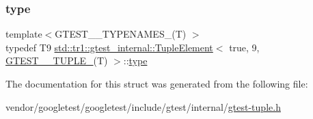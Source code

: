\subsubsection{\texorpdfstring{type}{type}}
{\footnotesize\ttfamily template$<$G\+T\+E\+S\+T\+\_\+\_\+\+T\+Y\+P\+E\+N\+A\+M\+E\+S\+\_\+(\+T) $>$ \\
typedef T9 \hyperlink{structstd_1_1tr1_1_1gtest__internal_1_1_tuple_element}{std\+::tr1\+::gtest\+\_\+internal\+::\+Tuple\+Element}$<$ true, 9, \hyperlink{namespacestd_1_1tr1_aa636d3269bf1f368a7bc09ff158bc482}{G\+T\+E\+S\+T\+\_\+\_\+\+T\+U\+P\+L\+E\+\_\+}(T) $>$\+::\hyperlink{structstd_1_1tr1_1_1gtest__internal_1_1_tuple_element_3_01true_00_019_00_01_g_t_e_s_t__10___t_u_p_l_e___07_t_08_01_4_a4ee11fd8d3873bfa7cce21c1ed2ea770}{type}}



The documentation for this struct was generated from the following file\+:\begin{DoxyCompactItemize}
\item 
vendor/googletest/googletest/include/gtest/internal/\hyperlink{gtest-tuple_8h}{gtest-\/tuple.\+h}\end{DoxyCompactItemize}

